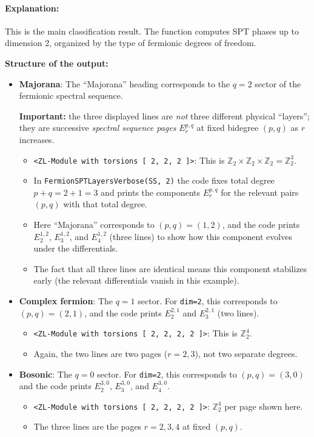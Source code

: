 \documentclass{SciPost}
\begin{document}
\paragraph{Explanation:}
This is the main classification result. The function computes SPT phases up to dimension 2, organized by the type of fermionic degrees of freedom.

\textbf{Structure of the output:}
\begin{itemize}
    \item \textbf{Majorana}: The ``Majorana'' heading corresponds to the $q=2$ sector of the fermionic spectral sequence.
    
    	\textbf{Important:} the three displayed lines are \emph{not} three different physical ``layers''; they are successive \emph{spectral sequence pages} $E_r^{p,q}$ at fixed bidegree $(p,q)$ as $r$ increases.
    \begin{itemize}
        \item \texttt{<ZL-Module with torsions [ 2, 2, 2 ]>}: This is $\mathbb{Z}_2 \times \mathbb{Z}_2 \times \mathbb{Z}_2 = \mathbb{Z}_2^3$.
        \item In \texttt{FermionSPTLayersVerbose(SS, 2)} the code fixes total degree $p+q=2+1=3$ and prints the components $E_r^{p,q}$ for the relevant pairs $(p,q)$ with that total degree.
        \item Here ``Majorana'' corresponds to $(p,q)=(1,2)$, and the code prints $E_2^{1,2}$, $E_3^{1,2}$, and $E_4^{1,2}$ (three lines) to show how this component evolves under the differentials.
        \item The fact that all three lines are identical means this component stabilizes early (the relevant differentials vanish in this example).
    \end{itemize}
    
    \item \textbf{Complex fermion}: The $q=1$ sector. For \texttt{dim=2}, this corresponds to $(p,q)=(2,1)$, and the code prints $E_2^{2,1}$ and $E_3^{2,1}$ (two lines).
    \begin{itemize}
        \item \texttt{<ZL-Module with torsions [ 2, 2, 2, 2 ]>}: This is $\mathbb{Z}_2^4$.
        \item Again, the two lines are two pages ($r=2,3$), not two separate degrees.
    \end{itemize}
    
    \item \textbf{Bosonic}: The $q=0$ sector. For \texttt{dim=2}, this corresponds to $(p,q)=(3,0)$ and the code prints $E_2^{3,0}$, $E_3^{3,0}$, and $E_4^{3,0}$.
    \begin{itemize}
        \item \texttt{<ZL-Module with torsions [ 2, 2, 2, 2 ]>}: $\mathbb{Z}_2^4$ per page shown here.
        \item The three lines are the pages $r=2,3,4$ at fixed $(p,q)$.
    \end{itemize}
\end{itemize}
\end{document}
